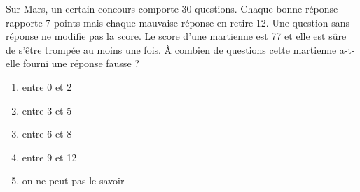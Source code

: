 Sur Mars, un certain concours comporte 30 questions. Chaque bonne réponse rapporte 7 points mais chaque mauvaise réponse en retire 12. Une question sans réponse  ne modifie pas la score. Le score d'une martienne est 77 et elle est sûre de s'être trompée au moins une fois. \`A combien de questions cette martienne a-t-elle fourni une réponse fausse ?
\begin{multicols}{3}
\begin{enumerate}[A/]
\item entre 0 et 2
\item entre 3 et 5
\item entre 6 et 8
\item entre 9 et 12
\item on ne peut pas le savoir
\end{enumerate}
\end{multicols}